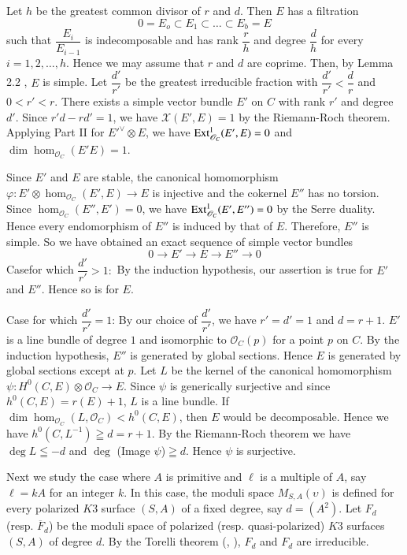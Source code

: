 \begin{Proof}
Let $h$ be the greatest common divisor of $r$ and $d$. Then $E$ has a
filtration
$$
0=E_o\subset E_1\subset\ldots\subset E_b=E
$$
such that $\dfrac{E_i}{E_{i-1}}$ is indecomposable and has rank
$\dfrac{r}{h}$ and degree $\dfrac{d}{h}$ for every
$i=1,2,\ldots,h$. Hence we may assume that $r$ and $d$ are
coprime. Then, by Lemma 2.2 \cite{key1}, $E$ is simple. Let
$\dfrac{d'}{r'}$ be the greatest irreducible fraction with
$\dfrac{d'}{r'}<\dfrac{d}{r}$ and $0<r'<r$. There exists a simple
vector bundle $E'$ on $C$ with rank $r'$ and degree $d'$. Since $r'
d-rd'=1$, we have $\mathcal{X}(E',E)=1$ by the Riemann-Roch
theorem. Applying Part II \cite{key1} for $E'^{\vee}\otimes E$, we
have $\mathrm{Ext}^{1}_{\mathscr{O}_C}(E',E)=0$ and
$\dim\hom_{\mathscr{O}_C}(E' E)=1$. 

Since $E'$ and $E$ are stable, the canonical homomorphism
$\varphi:E'\otimes \hom_{\mathscr{O}_C}(E',E)\to E$ is injective and
the cokernel $E''$ has no torsion. Since
$\hom_{\mathscr{O}_C}(E'',E')=0$, we have
$\mathrm{Ext}^{1}_{\mathscr{O}_C}(E',E'')=0$ by the Serre duality. Hence every
endomorphism of $E''$ is induced by that of $E$. Therefore, $E''$ is
simple. So we have obtained an exact sequence of simple vector bundles 
$$
0\to E'\to E\to E''\to 0
$$
Case\pageoriginale for which $\dfrac{d'}{r'}>1:$ By the induction hypothesis, our
assertion is true for $E'$ and $E''$. Hence so is for $E$.

Case for which $\dfrac{d'}{r'}=1$: By our choice of $\dfrac{d'}{r'}$,
we have $r'=d'=1$ and $d=r+1$. $E'$ is a line bundle of degree $1$ and
isomorphic to $\mathscr{O}_C(p)$ for a point $p$ on $C$. By the
induction hypothesis, $E''$ is generated by global sections. Hence $E$
is generated by global sections except at $p$. Let $L$ be the kernel
of the canonical homomorphism $\psi:H^{0}(C,E)\otimes \mathscr{O}_C\to
E$. Since $\psi$ is generically surjective and since
$h^{0}(C,E)=r(E)+1$, $L$ is a line bundle. If
$\dim\hom_{\mathscr{O}_C}(L,\mathscr{O}_C)<h^{0}{(C,E)}$, then $E$
would be decomposable. Hence we have $h^{0}(C,L^{-1})\geqq d=r+1$. By
the Riemann-Roch theorem we have $\deg L\leqq -d$ and $\deg$ (Image
$\psi$)$\geqq d$. Hence $\psi$ is surjective.
\enprf
\end{Proof}

Next we study the case where $A$ is primitive and $\ell$ is a multiple
of $A$, say $\ell=k A$ for an integer $k$. In this case, the moduli
space $M_{S,A}(\upsilon)$ is defined for every polarized $K3$ surface
$(S,A)$ of a fixed degree, say $d=(A^{2})$. Let $F_d$
(resp. $\overline{F}_d$) be the moduli space of polarized
(resp. quasi-polarized) $K3$ surfaces $(S,A)$ of degree $d$. By the
Torelli theorem (\cite{key7}, \cite{key20}), $F_d$ and $F_d$ are
irreducible. 

